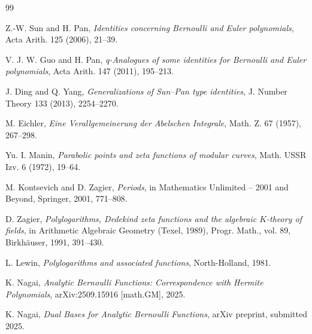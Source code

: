\documentclass[12pt]{article}
\numberwithin{equation}{section}
\begin{document}
\begin{thebibliography}{99}

Z.-W. Sun and H. Pan,
\emph{Identities concerning Bernoulli and Euler polynomials},
Acta Arith. 125 (2006), 21--39.

V. J. W. Guo and H. Pan,
\emph{q-Analogues of some identities for Bernoulli and Euler polynomials},
Acta Arith. 147 (2011), 195--213.

J. Ding and Q. Yang,
\emph{Generalizations of Sun--Pan type identities},
J. Number Theory 133 (2013), 2254--2270.

M. Eichler,
\emph{Eine Verallgemeinerung der Abelschen Integrale},
Math. Z. 67 (1957), 267--298.

Yu. I. Manin,
\emph{Parabolic points and zeta functions of modular curves},
Math. USSR Izv. 6 (1972), 19--64.

M. Kontsevich and D. Zagier,
\emph{Periods},
in Mathematics Unlimited -- 2001 and Beyond,
Springer, 2001, 771--808.

D. Zagier,
\emph{Polylogarithms, Dedekind zeta functions and the algebraic $K$-theory of fields},
in Arithmetic Algebraic Geometry (Texel, 1989),
Progr. Math., vol. 89, Birkhäuser, 1991, 391--430.

L. Lewin,
\emph{Polylogarithms and associated functions},
North-Holland, 1981.

K. Nagai,
\emph{Analytic Bernoulli Functions: Correspondence with Hermite Polynomials},
arXiv:2509.15916 [math.GM], 2025.

K. Nagai,
\emph{Dual Bases for Analytic Bernoulli Functions},
arXiv preprint, submitted 2025.

\end{thebibliography}
\end{document}
